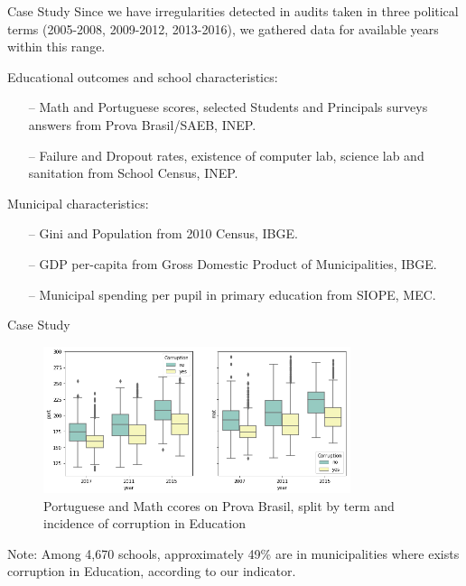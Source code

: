 \documentclass[handout,t,usenames,dvipsnames]{beamer}
\begin{document}
\begin{frame}{Case Study}
\justifying
\small
Since we have irregularities detected in audits taken in three political terms (2005-2008, 2009-2012, 2013-2016), we gathered data for available years within this range.
\vspace{1em}

{\color{emap-azul-escuro}Educational outcomes and school characteristics:}
\begin{itemize}
\justifying
    \item [--] Math and Portuguese scores, selected Students and Principals surveys answers from Prova Brasil/SAEB, INEP.
    \item [--] Failure and Dropout rates, existence of computer lab, science lab and sanitation from School Census, INEP.
\end{itemize}
\vspace{1em}

{\color{emap-azul-escuro} Municipal characteristics:}
\begin{itemize}
\justifying
    \item [--] Gini and Population from 2010 Census, IBGE.
    \item [--] GDP per-capita from Gross Domestic Product of Municipalities, IBGE.
    \item [--] Municipal spending per pupil in primary education from SIOPE, MEC.
\end{itemize}
\end{frame}



\begin{frame}{Case Study}


\begin{figure}[h!]
\includegraphics[width=9cm]{port_mat_grave.png}
\centering
\caption{Portuguese and Math ccores on Prova Brasil, split by term and incidence of corruption in Education}
\end{figure}
\small
\justifying
Note: Among 4,670 schools, approximately 49\% are in municipalities where exists corruption in Education, according to our indicator.
\end{frame}
\end{document}
